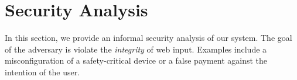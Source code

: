 \section{Security Analysis}
\label{sec:securityAnalysis_IK}

In this section, we provide an informal security analysis of our system. The goal of the adversary is violate the \emph{integrity} of web input. Examples include a misconfiguration of a safety-critical device or a false payment against the intention of the user. 


%
%



